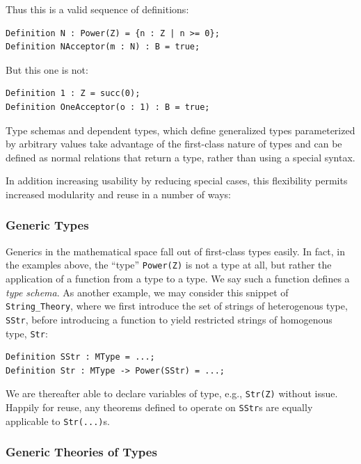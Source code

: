Thus this is a valid sequence of definitions:

\begin{lstlisting}
Definition N : Power(Z) = {n : Z | n >= 0};
Definition NAcceptor(m : N) : B = true;
\end{lstlisting}

But this one is not:

\begin{lstlisting}
Definition 1 : Z = succ(0);
Definition OneAcceptor(o : 1) : B = true;
\end{lstlisting}

Type schemas and dependent types, which define generalized types parameterized by arbitrary values take advantage of the first-class nature of types and can be defined as normal relations that return a type, rather than using a special syntax.  

In addition increasing usability by reducing special cases, this flexibility permits increased modularity and reuse in a number of ways:

		\subsubsection{Generic Types\label{genericTypes}}

Generics in the mathematical space fall out of first-class types easily.  In fact, in the examples above, the ``type'' \texttt{Power(Z)} is not a type at all, but rather the application of a function from a type to a type.  We say such a function defines a \emph{type schema}.  As another example, we may consider this snippet of \texttt{String\_Theory}, where we first introduce the set of strings of heterogenous type, \texttt{SStr}, before introducing a function to yield restricted strings of homogenous type, \texttt{Str}:

\begin{lstlisting}
Definition SStr : MType = ...;
Definition Str : MType -> Power(SStr) = ...;
\end{lstlisting}

We are thereafter able to declare variables of type, e.g., \texttt{Str(Z)} without issue.  Happily for reuse, any theorems defined to operate on \texttt{SStr}s are equally applicable to \texttt{Str(...)}s.

		\subsubsection{Generic Theories of Types\label{genericTheoriesTypes}}

